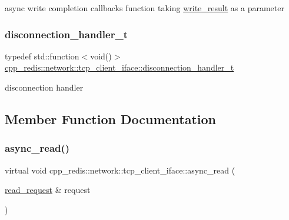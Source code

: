 async write completion callbacks function taking \mbox{\hyperlink{structcpp__redis_1_1network_1_1tcp__client__iface_1_1write__result}{write\+\_\+result}} as a parameter \mbox{\label{classcpp__redis_1_1network_1_1tcp__client__iface_a9a7d5942205db8be03da581a848b8ec0}} 
\subsubsection{\texorpdfstring{disconnection\+\_\+handler\+\_\+t}{disconnection\_handler\_t}}
{\footnotesize\ttfamily typedef std\+::function$<$void()$>$ \mbox{\hyperlink{classcpp__redis_1_1network_1_1tcp__client__iface_a9a7d5942205db8be03da581a848b8ec0}{cpp\+\_\+redis\+::network\+::tcp\+\_\+client\+\_\+iface\+::disconnection\+\_\+handler\+\_\+t}}}

disconnection handler 

\subsection{Member Function Documentation}
\mbox{\label{classcpp__redis_1_1network_1_1tcp__client__iface_ae1f9fa87002273a0caf340407bb68ade}} 
\subsubsection{\texorpdfstring{async\+\_\+read()}{async\_read()}}
{\footnotesize\ttfamily virtual void cpp\+\_\+redis\+::network\+::tcp\+\_\+client\+\_\+iface\+::async\+\_\+read (\begin{DoxyParamCaption}\item[{\mbox{\hyperlink{structcpp__redis_1_1network_1_1tcp__client__iface_1_1read__request}{read\+\_\+request}} \&}]{request }\end{DoxyParamCaption})\hspace{0.3cm}{\ttfamily [pure virtual]}}

